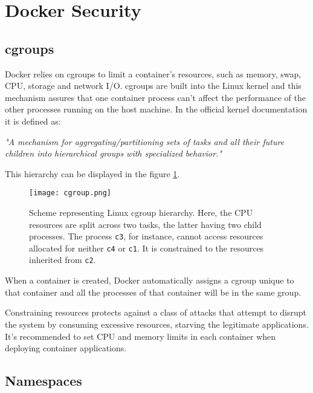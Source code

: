 
\section{Docker Security}
\label{sec::security}


\subsection{cgroups}
\label{ssec::security:cgroups}

Docker relies on cgroups to limit a container's resources, such as memory, swap, \acs{CPU}, storage and network I/O. cgroups are built into the Linux kernel and this mechanism assures that one container process can't affect the performance of the other processes running on the host machine. In the official kernel documentation it is defined as:
\begin{displayquote}
    \textit{"A mechanism for aggregating/partitioning sets of tasks and all their future children into hierarchical groups with specialized behavior."}
\end{displayquote}
This hierarchy can be displayed in the figure \ref{fig:cgroup-hch}.

\begin{figure}[!htb]
    \centering
    \texttt{[image: cgroup.png]}
    \caption{Scheme representing Linux cgroup hierarchy\cite{fig-src:cgroups}. Here, the \acs{CPU} resources are split across two tasks, the latter having two child processes. The process \texttt{c3}, for instance, cannot access resources allocated for neither \texttt{c4} or \texttt{c1}. It is constrained to the resources inherited from \texttt{c2}.}
    \label{fig:cgroup-hch}
\end{figure}

When a container is created, Docker automatically assigns a cgroup unique to that container and all the processes of that container will be in the same group.

Constraining resources protects against a class of attacks that attempt to disrupt the system by consuming excessive resources, starving the legitimate applications. It's recommended to set CPU and memory limits in each container when deploying container applications.


\subsection{Namespaces}
\label{ssec::security:namespaces}

